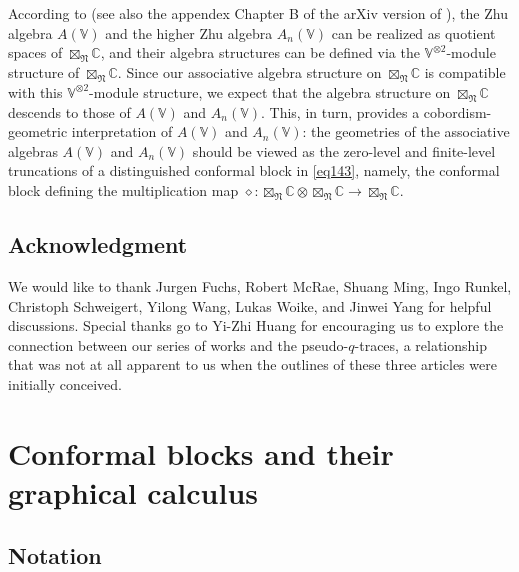 \documentclass[11pt,b5paper,notitlepage]{article}
\theoremstyle{definition}
\theoremstyle{plain}
\newcommand{\Vbb}{\mathbb V}
\newcommand{\Cbb}{\mathbb C}
\newcommand{\<}{\left\langle}
\renewcommand{\>}{\right\rangle}
\newcommand{\fn}{\mathfrak{N}}
\numberwithin{equation}{section}
\begin{document}
According to \cite{Li-regular-Zhu,Li-regular-AnV} (see also the appendex Chapter B of the arXiv version of \cite{GZ1}), the Zhu algebra $A(\Vbb)$ and the higher Zhu algebra $A_n(\Vbb)$ can be realized as quotient spaces of $\boxtimes_\fn\Cbb$, and their algebra structures can be defined via the $\Vbb^{\otimes2}$-module structure of $\boxtimes_\fn\Cbb$. Since our associative algebra structure on $\boxtimes_\fn\Cbb$ is compatible with this $\Vbb^{\otimes2}$-module structure, we expect that the algebra structure on $\boxtimes_\fn\Cbb$ descends to those of $A(\Vbb)$ and $A_n(\Vbb)$. This, in turn, provides a cobordism-geometric interpretation of $A(\Vbb)$ and $A_n(\Vbb)$: the geometries of the associative algebras $A(\Vbb)$ and $A_n(\Vbb)$ should be viewed as the zero-level and finite-level truncations of a distinguished conformal block in \eqref{eq143}, namely, the conformal block defining the multiplication map $\diamond:\boxtimes_\fn\Cbb\otimes\boxtimes_\fn\Cbb\rightarrow\boxtimes_\fn\Cbb$.





\subsection*{Acknowledgment}

We would like to thank Jurgen Fuchs, Robert McRae, Shuang Ming, Ingo Runkel, Christoph Schweigert, Yilong Wang,  Lukas Woike, and Jinwei Yang for helpful discussions. Special thanks go to Yi-Zhi Huang for encouraging us to explore the connection between our series of works \cite{GZ1,GZ2,GZ3} and the pseudo-$q$-traces, a relationship that was not at all apparent to us when the outlines of these three articles were initially conceived.














\section{Conformal blocks and their graphical calculus}



\subsection{Notation}\label{lb32}
\end{document}
